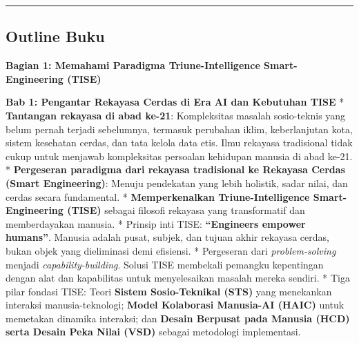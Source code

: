 \documentclass[
  letterpaper,
  DIV=11,
  numbers=noendperiod]{scrreprt}
\begin{document}
\begin{center}\rule{0.5\linewidth}{0.5pt}\end{center}

\subsection*{\texorpdfstring{\textbf{Outline
Buku}}{Outline Buku}}\label{outline-buku}

\textbf{Bagian 1: Memahami Paradigma Triune-Intelligence
Smart-Engineering (TISE)}

\textbf{Bab 1: Pengantar Rekayasa Cerdas di Era AI dan Kebutuhan TISE} *
\textbf{Tantangan rekayasa di abad ke-21}: Kompleksitas masalah
sosio-teknis yang belum pernah terjadi sebelumnya, termasuk perubahan
iklim, keberlanjutan kota, sistem kesehatan cerdas, dan tata kelola data
etis. Ilmu rekayasa tradisional tidak cukup untuk menjawab kompleksitas
persoalan kehidupan manusia di abad ke-21. * \textbf{Pergeseran
paradigma dari rekayasa tradisional ke Rekayasa Cerdas (Smart
Engineering)}: Menuju pendekatan yang lebih holistik, sadar nilai, dan
cerdas secara fundamental. * \textbf{Memperkenalkan Triune-Intelligence
Smart-Engineering (TISE)} sebagai filosofi rekayasa yang transformatif
dan memberdayakan manusia. * Prinsip inti TISE: \textbf{``Engineers
empower humans''}. Manusia adalah pusat, subjek, dan tujuan akhir
rekayasa cerdas, bukan objek yang dieliminasi demi efisiensi. *
Pergeseran dari \emph{problem-solving} menjadi
\emph{capability-building}. Solusi TISE membekali pemangku kepentingan
dengan alat dan kapabilitas untuk menyelesaikan masalah mereka sendiri.
* Tiga pilar fondasi TISE: Teori \textbf{Sistem Sosio-Teknikal (STS)}
yang menekankan interaksi manusia-teknologi; \textbf{Model Kolaborasi
Manusia-AI (HAIC)} untuk memetakan dinamika interaksi; dan
\textbf{Desain Berpusat pada Manusia (HCD) serta Desain Peka Nilai
(VSD)} sebagai metodologi implementasi.
\end{document}
